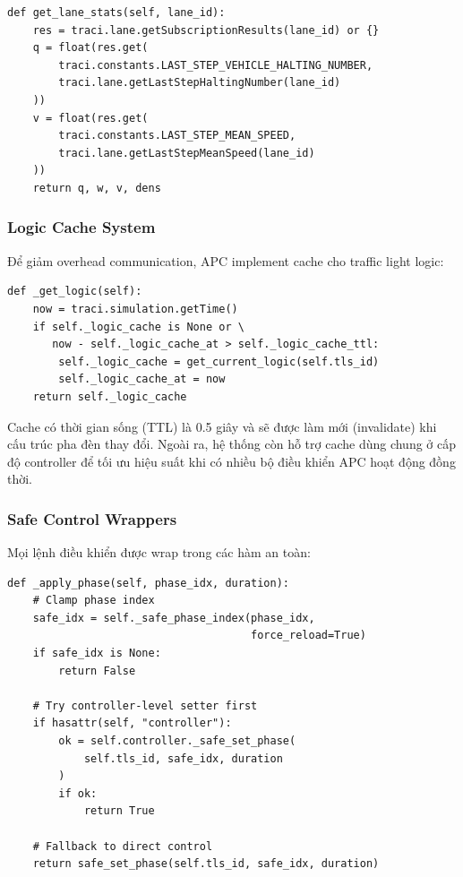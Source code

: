 \begin{lstlisting}[style=py, caption={Xử lý subscription results}]
def get_lane_stats(self, lane_id):
    res = traci.lane.getSubscriptionResults(lane_id) or {}
    q = float(res.get(
        traci.constants.LAST_STEP_VEHICLE_HALTING_NUMBER,
        traci.lane.getLastStepHaltingNumber(lane_id)
    ))
    v = float(res.get(
        traci.constants.LAST_STEP_MEAN_SPEED,
        traci.lane.getLastStepMeanSpeed(lane_id)
    ))
    return q, w, v, dens
\end{lstlisting}

\subsubsection{Logic Cache System}
Để giảm overhead communication, APC implement cache cho traffic light logic:

\begin{lstlisting}[style=py, caption={Cơ chế cache logic}]
def _get_logic(self):
    now = traci.simulation.getTime()
    if self._logic_cache is None or \
       now - self._logic_cache_at > self._logic_cache_ttl:
        self._logic_cache = get_current_logic(self.tls_id)
        self._logic_cache_at = now
    return self._logic_cache
\end{lstlisting}

Cache có thời gian sống (TTL) là 0.5 giây và sẽ được làm mới (invalidate) khi cấu trúc pha đèn thay đổi. Ngoài ra, hệ thống còn hỗ trợ cache dùng chung ở cấp độ controller để tối ưu hiệu suất khi có nhiều bộ điều khiển APC hoạt động đồng thời.

\subsubsection{Safe Control Wrappers}
Mọi lệnh điều khiển được wrap trong các hàm an toàn:

\begin{lstlisting}[style=py, caption={Safe phase control}]
def _apply_phase(self, phase_idx, duration):
    # Clamp phase index
    safe_idx = self._safe_phase_index(phase_idx, 
                                      force_reload=True)
    if safe_idx is None:
        return False
    
    # Try controller-level setter first
    if hasattr(self, "controller"):
        ok = self.controller._safe_set_phase(
            self.tls_id, safe_idx, duration
        )
        if ok:
            return True
            
    # Fallback to direct control
    return safe_set_phase(self.tls_id, safe_idx, duration)
\end{lstlisting}

